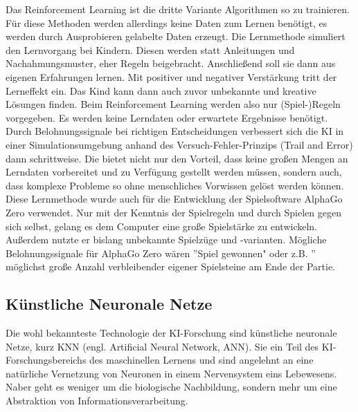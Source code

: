 \documentclass[a4paper,12pt, german]{report}
\begin{document}
Das Reinforcement Learning ist die dritte Variante Algorithmen so zu trainieren. Für diese Methoden werden allerdings keine Daten zum Lernen benötigt, es werden durch Ausprobieren gelabelte Daten erzeugt. \cite{17} \newline
Die Lernmethode simuliert den Lernvorgang bei Kindern. Diesen werden statt Anleitungen und Nachahmungsmuster, eher Regeln beigebracht. Anschließend soll sie dann aus eigenen Erfahrungen lernen. Mit positiver und negativer Verstärkung tritt der Lerneffekt ein. Das Kind kann dann auch zuvor unbekannte und kreative Lösungen finden.
Beim Reinforcement Learning werden also nur (Spiel-)Regeln vorgegeben. Es werden keine Lerndaten oder erwartete Ergebnisse benötigt. Durch Belohnungssignale bei richtigen Entscheidungen verbessert sich die KI in einer Simulationsumgebung anhand des Versuch-Fehler-Prinzips (Trail and Error) dann schrittweise. Die bietet nicht nur den Vorteil, dass keine großen Mengen an Lerndaten vorbereitet und zu Verfügung gestellt werden müssen, sondern auch, dass komplexe Probleme so ohne menschliches Vorwissen gelöst werden können.%
\newline
Diese Lernmethode wurde auch für die Entwicklung der Spielsoftware AlphaGo Zero verwendet. Nur mit der Kenntnis der Spielregeln und durch Spielen gegen sich selbst, gelang es dem Computer eine große Spielstärke zu entwickeln. Außerdem nutzte er bislang unbekannte Spielzüge und -varianten. Mögliche Belohnungssignale für AlphaGo Zero wären ''Spiel gewonnen" oder z.B. '' möglichst große Anzahl verbleibender eigener Spielsteine am Ende der Partie.
\cite{02}

\subsection{Künstliche Neuronale Netze}

Die wohl bekannteste Technologie der KI-Forschung sind künstliche neuronale Netze, kurz KNN (engl. Artificial Neural Network, ANN). Sie ein Teil des KI-Forschungsbereichs des maschinellen Lernens und sind angelehnt an eine natürliche Vernetzung von Neuronen in einem Nervensystem eins Lebewesens. Naber geht es weniger um die biologische Nachbildung, sondern mehr um eine Abstraktion von Informationsverarbeitung. 
\end{document}
